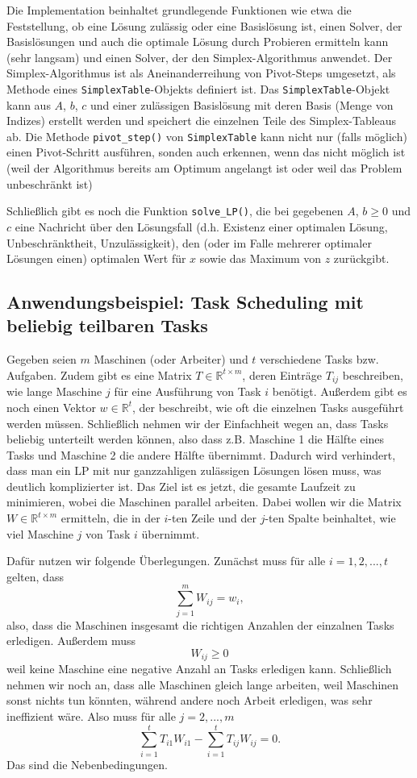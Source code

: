 \documentclass{article}
\begin{document}
Die Implementation beinhaltet grundlegende Funktionen wie etwa die Feststellung, ob eine Lösung zulässig oder eine Basislösung ist, einen Solver, der Basislösungen und auch die optimale Lösung durch Probieren ermitteln kann (sehr langsam) und einen Solver, der den Simplex-Algorithmus anwendet. Der Simplex-Algorithmus ist als Aneinanderreihung von Pivot-Steps umgesetzt, als Methode eines \texttt{SimplexTable}-Objekts definiert ist. Das \texttt{SimplexTable}-Objekt kann aus \(A\), \(b\), \(c\) und einer zulässigen Basislösung mit deren Basis (Menge von Indizes) erstellt werden und speichert die einzelnen Teile des Simplex-Tableaus ab. Die Methode \texttt{pivot\_step()} von \texttt{SimplexTable} kann nicht nur (falls möglich) einen Pivot-Schritt ausführen, sonden auch erkennen, wenn das nicht möglich ist (weil der Algorithmus bereits am Optimum angelangt ist oder weil das Problem unbeschränkt ist)

Schließlich gibt es noch die Funktion \texttt{solve\_LP()}, die bei gegebenen \(A\), \(b\geq0\) und \(c\) eine Nachricht über den Lösungsfall (d.h. Existenz einer optimalen Lösung, Unbeschränktheit, Unzulässigkeit), den (oder im Falle mehrerer optimaler Lösungen einen) optimalen Wert für \(x\) sowie das Maximum von \(z\) zurückgibt.

\subsection{Anwendungsbeispiel: Task Scheduling mit beliebig teilbaren Tasks}
Gegeben seien \(m\) Maschinen (oder Arbeiter) und \(t\) verschiedene Tasks bzw. Aufgaben. Zudem gibt es eine Matrix \(T\in\mathbb R^{t\times m}\), deren Einträge \(T_{ij}\) beschreiben, wie lange Maschine \(j\) für eine Ausführung von Task \(i\) benötigt. Außerdem gibt es noch einen Vektor \(w\in\mathbb R^t\), der beschreibt, wie oft die einzelnen Tasks ausgeführt werden müssen. Schließlich nehmen wir der Einfachheit wegen an, dass Tasks beliebig unterteilt werden können, also dass z.B. Maschine 1 die Hälfte eines Tasks und Maschine 2 die andere Hälfte übernimmt. Dadurch wird verhindert, dass man ein LP mit nur ganzzahligen zulässigen Lösungen lösen muss, was deutlich komplizierter ist. Das Ziel ist es jetzt, die gesamte Laufzeit zu minimieren, wobei die Maschinen parallel arbeiten. Dabei wollen wir die Matrix \(W\in\mathbb R^{t\times m}\) ermitteln, die in der \(i\)-ten Zeile und der \(j\)-ten Spalte beinhaltet, wie viel Maschine \(j\) von Task \(i\) übernimmt.

Dafür nutzen wir folgende Überlegungen. Zunächst muss für alle \(i=1,2,...,t\) gelten, dass\[
\sum\limits_{j=1}^mW_{ij}=w_i,
\]also, dass die Maschinen insgesamt die richtigen Anzahlen der einzalnen Tasks erledigen. Außerdem muss \[
W_{ij}\geq0
\]weil keine Maschine eine negative Anzahl an Tasks erledigen kann. Schließlich nehmen wir noch an, dass alle Maschinen gleich lange arbeiten, weil Maschinen sonst nichts tun könnten, während andere noch Arbeit erledigen, was sehr ineffizient wäre. Also muss für alle \(j=2,...,m\)\[
\sum\limits_{i=1}^tT_{i1}W_{i1}-\sum\limits_{i=1}^tT_{ij}W_{ij}=0.
\]
Das sind die Nebenbedingungen. 
\end{document}
